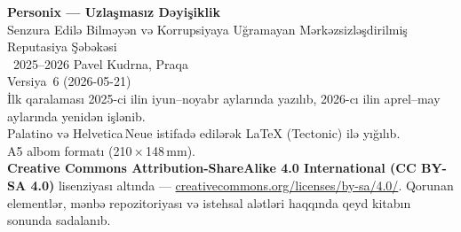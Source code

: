 \thispagestyle{empty}
\ifdefined\printmode\vspace*{\fill}\else{}\fi
\begin{flushleft}\small\sffamily
\textbf{Personix --- Uzlaşmasız Dəyişiklik}\\[0.3em]
Senzura Edilə Bilməyən və Korrupsiyaya Uğramayan Mərkəzsizləşdirilmiş Reputasiya Şəbəkəsi\\[1.4em]

\textcopyright\ 2025--2026 Pavel Kudrna, Praqa\\[0.4em]

Versiya~6 (2026-05-21)\\
İlk qaralaması 2025-ci ilin iyun--noyabr aylarında yazılıb, 2026-cı ilin aprel--may aylarında yenidən işlənib.\\[1.4em]

Palatino və Helvetica\,Neue istifadə edilərək \LaTeX{} (Tectonic) ilə yığılıb.\\
A5 albom formatı (210\,$\times$\,148\,mm).\\[1.4em]

\textbf{Creative Commons Attribution-ShareAlike 4.0
International (CC BY-SA 4.0)} lisenziyası altında ---
\href{https://creativecommons.org/licenses/by-sa/4.0/}{creativecommons.org/licenses/by-sa/4.0/}.
Qorunan elementlər, mənbə repozitoriyası və istehsal alətləri haqqında qeyd
kitabın sonunda sadalanıb.
\end{flushleft}
\ifdefined\printmode\else{}\fi
\clearpage
